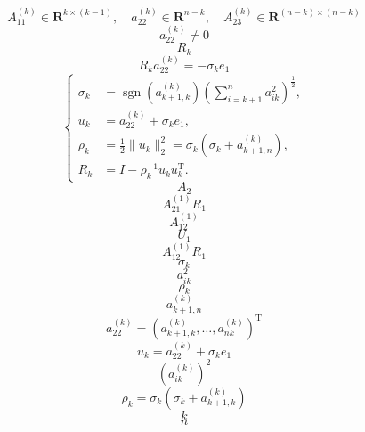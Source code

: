 \documentclass[fontset=fandol]{ctexart}
\begin{document}
\[
A_{11}^{(k)}\in\mathbf R^{k\times(k-1)},\quad a_{22}^{(k)}\in\mathbf R^{n-k},\quad A_{23}^{(k)}\in\mathbf R^{(n-k)\times(n-k)}
\]
\[
a_{22}^{(k)}\ne0
\]
\[
R_k
\]
\[
R_ka_{22}^{(k)}=-\sigma_ke_1
\]
\[
\left\{
\begin{aligned}
\sigma_k&=\operatorname{sgn}(a_{k+1,k}^{(k)})\left(\sum_{i=k+1}^na_{ik}^2\right)^{\frac12},\\
u_k&=a_{22}^{(k)}+\sigma_ke_1,\\
\rho_k&=\frac12\|u_k\|_2^2=\sigma_k(\sigma_k+a_{k+1,n}^{(k)}),\\
R_k&=I-\rho_k^{-1}u_ku_k^{\mathrm T}.
\end{aligned}
\right.
\tag{9.3.2}
\]
\[
A_2
\]
\[
A_{21}^{(1)}R_1
\]
\[
A_{12}^{(1)}
\]
\[
U_1
\]
\[
A_{12}^{(1)}R_1
\]
\[
\sigma_k
\]
\[
a_{ik}^2
\]
\[
\rho_k
\]
\[
a_{k+1,n}^{(k)}
\]
\[
a_{22}^{(k)}=(a_{k+1,k}^{(k)},\ldots,a_{nk}^{(k)})^{\mathrm T}
\]
\[
u_k=a_{22}^{(k)}+\sigma_ke_1
\]
\[
(a_{ik}^{(k)})^2
\]
\[
\rho_k=\sigma_k(\sigma_k+a_{k+1,k}^{(k)})
\]
\[
k
\]
\[
n
\]
\end{document}
